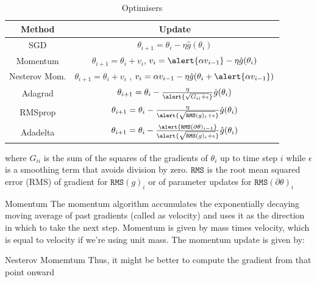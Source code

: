 \documentclass[xcolor=pdftex,dvipsnames,table,mathserif]{beamer}
\begin{document}
\begin{frame}
\begin{table}[htp]
\caption{Optimisers}
\begin{center}
\begin{tabular}{|c|c|} \hline
Method & Update\\ \hline
SGD  & $\theta_{i+1}= \theta_{i}-\eta\hat{g}(\theta_{i})$ \\ \hline
Momentum    & $\theta_{i+1}= \theta_{i}+v_i$, $v_{i}= \alert{\alpha v_{i-1}} -\eta \hat{g}(\theta_{i}) $ \\  \hline
Nesterov Mom.  &  $\theta_{i+1}= \theta_{i}+v_i$ , $v_i= \alpha v_{i-1} -\eta\hat{g}(\theta_{i}+ \alert{\alpha v_{i-1}}) $\\ \hline
Adagrad & $\theta_{i+1}= \theta_{i}- \frac{\eta}{\alert{\sqrt { G_{ii}+\epsilon  }}} \hat{g}(\theta_{i})$  \\ \hline
RMSprop & $\theta_{i+1}= \theta_{i}- \frac{\eta}{\alert{\sqrt { \texttt{RMS}(g)_{i}+\epsilon  }}} \hat{g}(\theta_{i})$  \\ \hline
Adadelta & $ \theta_{i+1}= \theta_{i}- \frac{\alert{ \texttt{RMS}(\partial\theta)_{i-1}}}{\alert{\sqrt { \texttt{RMS}(g)_{i}+\epsilon  }}} \hat{g}(\theta_{i})
$ \\ \hline
\end{tabular}
\end{center}
\label{default}
\end{table}%
where $G_{ii}$ is the sum of the squares of the gradients of $\theta_i$ up to time step $i$ while $\epsilon$ is a smoothing term that avoids division by zero.
$\texttt{RMS}$ is the root mean squared error  (RMS)  of gradient for $\texttt{RMS}(g)_{i}$ or of parameter updates for $\texttt{RMS}(\partial \theta)_{i}$ 
\end{frame}


\begin{frame}{Momentum}
The momentum algorithm accumulates the exponentially decaying moving average of past gradients (called as velocity) and uses it as the direction in which to take the next step. Momentum is given by mass times velocity, which is equal to velocity if we’re using unit mass. The momentum update is given by:
\end{frame}

\begin{frame}{Nesterov Momemtum}
Thus, it might be better to compute the gradient from that point onward
\end{frame}


\end{document}
